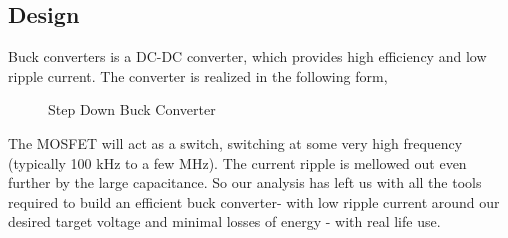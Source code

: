 \subsection{Design}
Buck converters is a DC-DC converter, which provides high efficiency and low ripple current. The converter is realized in the following form, 
\begin{figure}[!ht]
\centering
{}%
\caption{Step Down Buck Converter}
\end{figure}
The MOSFET will act as a switch, switching at some very high frequency (typically 100 kHz to a few MHz). The current ripple is mellowed out even further by the large capacitance. So our analysis has left us with all the tools required to build an efficient buck converter- with low ripple current around our desired target voltage and minimal losses of energy - with real life use.
